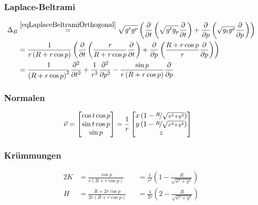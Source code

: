     \subsubsection{Laplace-Beltrami}
      \begin{align}
        \Delta_{B} &\overset{\eqref{eqLaplaceBeltramiOrthogonal}}{=} \sqrt{g^{t}g^{p}} 
                      \left(  \frac{\partial}{\partial t} 
                             \left( \sqrt{g^{t}g_{p}} \frac{\partial}{\partial t} \right) 
                                  + \frac{\partial}{\partial p} \left( \sqrt{g_{t}g^{p}} \frac{\partial}{\partial p} 
                       \right) \right) \\
                   &= \frac{1}{r\left( R + r\cos p \right)}
                      \left(  \frac{\partial}{\partial t} 
                             \left( \frac{r}{R + r\cos p} \frac{\partial}{\partial t} \right) 
                                  + \frac{\partial}{\partial p} \left( \frac{ R + r\cos p}{r} \frac{\partial}{\partial p} 
                       \right) \right) \\
                   &= \frac{1}{\left( R + r\cos p \right)^{2}} \frac{\partial^{2}}{\partial t^{2}}
                       + \frac{1}{r^{2}} \frac{\partial^{2}}{\partial p^{2}}
                       - \frac{\sin p}{r\left( R + r\cos p \right)} \frac{\partial}{\partial p}
      \end{align}

    \subsubsection{Normalen}
      \begin{align}
        \vec{\nu} &=\begin{bmatrix}
                      \cos t \cos p \\
                      \sin t \cos p \\
                      \sin p
                    \end{bmatrix}
                   =\frac{1}{r}\begin{bmatrix}
                        x \left( 1 - \nicefrac{R}{\sqrt{x^{2}+y^{2}}} \right) \\
                        y \left( 1 - \nicefrac{R}{\sqrt{x^{2}+y^{2}}} \right) \\
                        z
                    \end{bmatrix}
      \end{align}

    \subsubsection{Krümmungen}
      \begin{alignat}{2}
        K &= \frac{\cos p}{r\left( R + r \cos p \right)}
          && = \frac{1}{r^{2}}\left( 1 - \frac{R}{\sqrt{x^{2}+y^{2}}} \right) \\
        H &= \frac{R + 2r\cos p}{2r\left( R + r \cos p \right)}
          && = \frac{1}{2r}\left( 2 - \frac{R}{\sqrt{x^{2}+y^{2}}} \right)
      \end{alignat}

